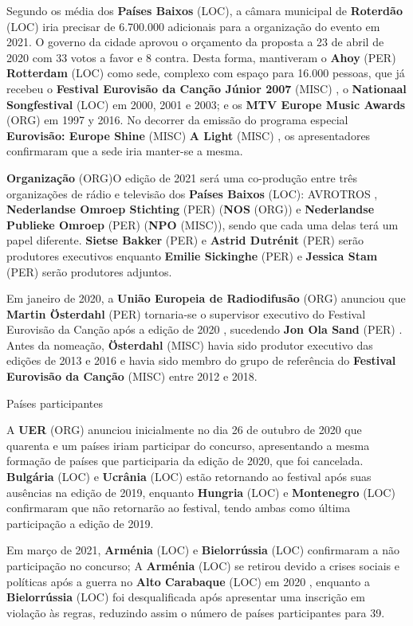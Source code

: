 \documentclass[12pt,a4paper]{article}
\begin{document}
Segundo os média dos \textbf{Países Baixos} (LOC), a câmara municipal de \textbf{Roterdão} (LOC) iria precisar de 6.700.000 adicionais para a organização do evento em 2021. O governo da cidade aprovou o orçamento da proposta a 23 de abril de 2020 com 33 votos a favor e 8 contra. Desta forma, mantiveram o \textbf{Ahoy} (PER) \textbf{Rotterdam} (LOC) como sede, complexo com espaço para 16.000 pessoas, que já recebeu o \textbf{Festival Eurovisão da Canção Júnior 2007} (MISC) , o \textbf{Nationaal Songfestival} (LOC) em 2000, 2001 e 2003; e os \textbf{MTV Europe Music Awards} (ORG) em 1997 y 2016. No decorrer da emissão do programa especial \textbf{Eurovisão: Europe Shine} (MISC) \textbf{A Light} (MISC) , os apresentadores confirmaram que a sede iria manter-se a mesma.



\textbf{Organização} (ORG)O edição de 2021 será uma co-produção entre três organizações de rádio e televisão dos \textbf{Países Baixos} (LOC): AVROTROS , \textbf{Nederlandse Omroep Stichting} (PER) (\textbf{NOS} (ORG)) e \textbf{Nederlandse Publieke Omroep} (PER) (\textbf{NPO} (MISC)), sendo que cada uma delas terá um papel diferente. \textbf{Sietse Bakker} (PER) e \textbf{Astrid Dutrénit} (PER) serão produtores executivos enquanto \textbf{Emilie Sickinghe} (PER) e \textbf{Jessica Stam} (PER) serão produtores adjuntos.

Em janeiro de 2020, a \textbf{União Europeia de Radiodifusão} (ORG) anunciou que \textbf{Martin Österdahl} (PER) tornaria-se o supervisor executivo do Festival Eurovisão da Canção após a edição de 2020 , sucedendo \textbf{Jon Ola Sand} (PER) . Antes da nomeação, \textbf{Österdahl} (MISC) havia sido produtor executivo das edições de 2013 e 2016 e havia sido membro do grupo de referência do \textbf{Festival Eurovisão da Canção} (MISC) entre 2012 e 2018.



Países participantes

A \textbf{UER} (ORG) anunciou inicialmente no dia 26 de outubro de 2020 que quarenta e um países iriam participar do concurso, apresentando a mesma formação de países que participaria da edição de 2020, que foi cancelada. \textbf{Bulgária} (LOC) e \textbf{Ucrânia} (LOC) estão retornando ao festival após suas ausências na edição de 2019, enquanto \textbf{Hungria} (LOC) e \textbf{Montenegro} (LOC) confirmaram que não retornarão ao festival, tendo ambas como última participação a edição de 2019.

Em março de 2021, \textbf{Arménia} (LOC) e \textbf{Bielorrússia} (LOC) confirmaram a não participação no concurso; A \textbf{Arménia} (LOC) se retirou devido a crises sociais e políticas após a guerra no \textbf{Alto Carabaque} (LOC) em 2020 , enquanto a \textbf{Bielorrússia} (LOC) foi desqualificada após apresentar uma inscrição em violação às regras, reduzindo assim o número de países participantes para 39.
\end{document}
